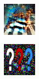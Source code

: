 \begin{figure}[!h]
\begin{subfigure}{.19\linewidth}
\end{subfigure}
\begin{subfigure}{.19\linewidth}
  \centering
  \includegraphics[width=0.7\linewidth]{imgs/16}
\end{subfigure}
\begin{subfigure}{.19\linewidth}
  \centering
  \includegraphics[width=0.7\linewidth]{imgs/20}
\end{subfigure}


\end{figure}

